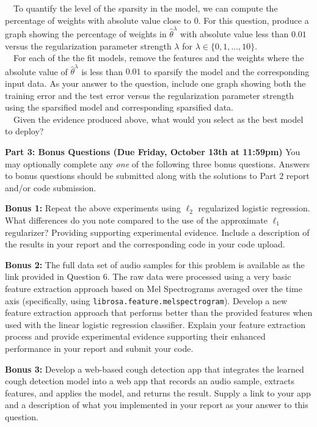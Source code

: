 \documentclass[11pt]{article}
\begin{document}
\begin{problem}{50}
 ~~To quantify the level of the sparsity in the model, we can compute the percentage of weights with absolute value close to $0$. For this question, produce a graph showing the percentage of weights in $\hat{\theta}^{\lambda}$ with absolute value less than $0.01$ versus the regularization parameter strength $\lambda$ for $\lambda\in\{0,1,...,10\}$.\\

 ~~For each of the the fit models, remove the features and the weights where the absolute value of $\hat{\theta}^{\lambda}$ is less than $0.01$ to sparsify the model and the corresponding input data. As your answer to the question, include one graph showing both the training error and the test error versus the regularization parameter strength using the sparsified model and corresponding sparsified data. \\

 ~~Given the evidence produced above, what would you select as the best model to deploy?\\

\end{problem}

\clearpage
\textbf{Part 3: Bonus Questions (Due Friday, October 13th at 11:59pm)} 
You may optionally complete any \textit{one} of the following three bonus questions. Answers to bonus questions should be submitted along with the solutions to Part 2 report and/or code submission.

\begin{problem}{5}
\textbf{Bonus 1:} Repeat the above experiments using $\ell_2$ regularized logistic regression. What differences do you note compared to the use of the approximate $\ell_1$ regularizer? Providing supporting experimental evidence. Include a description of the results in your report and the corresponding code in your code upload.
\end{problem}

\begin{problem}{5}
\textbf{Bonus 2:} The full data set of audio samples for this problem is available as the link provided in Question 6. The raw data were processed using a very basic feature extraction approach based on Mel Spectrograms averaged over the time axis (specifically, using \verb|librosa.feature.melspectrogram|). Develop a new feature extraction approach that performs better than the provided features when used with the linear logistic regression classifier. Explain your feature extraction process and provide experimental evidence supporting their enhanced performance in your report and submit your code.
\end{problem}

\begin{problem}{5}
\textbf{Bonus 3:} Develop a web-based cough detection app that integrates the learned cough detection model into a web app that records an audio sample, extracts features, and applies the model, and returns the result. Supply a link to your app and a description of what you implemented in your report as your answer to this question.
\end{problem}

\showpoints
\end{document}
